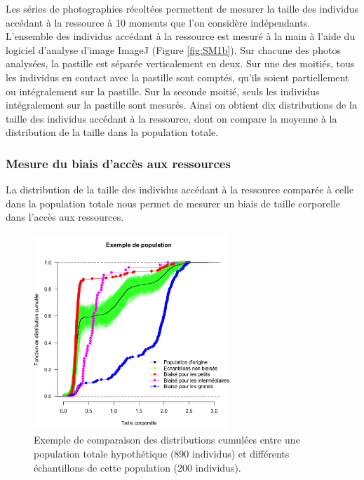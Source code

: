Les séries de photographies récoltées permettent de mesurer la taille des
individus accédant à la ressource à 10 moments que l'on considère indépendants.
L'ensemble des individus accédant à la ressource est mesuré à la main à l'aide
du logiciel d'analyse d'image ImageJ (Figure \ref{fig:SM1b}). Sur chacune des
photos analysées, la pastille est séparée verticalement en deux. Sur une des
moitiés, tous les individus en contact avec la pastille sont comptés, qu'ils
soient partiellement ou intégralement sur la pastille. Sur la seconde moitié, seuls les individus
intégralement sur la pastille sont mesurés. Ainsi on obtient dix distributions de la taille des individus accédant
à la ressource, dont on compare la moyenne à la distribution de la taille dans la population totale.

\subsubsection{Mesure du biais d'accès aux ressources}

La distribution de la taille des individus accédant à la ressource comparée à
celle dans la population totale nous permet de mesurer un biais de taille
corporelle dans l'accès aux ressources.

\begin{figure}[!ht]
\begin{center}
\includegraphics[width=0.66\textwidth]{1_CorpsDeThese/Resumes/Fig/SM02}
\caption[Comparaison des
distributions cumulées]{Exemple de comparaison des distributions cumulées entre
une population totale hypothétique (890 individus) et différents échantillons de
cette population (200 individus).
}
\label{fig:SM2}
\end{center}
\end{figure}

